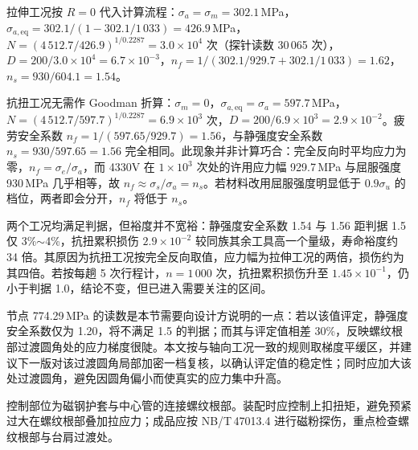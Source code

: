 拉伸工况按 $R=0$ 代入计算流程：$\sigma_a=\sigma_m=302.1$\,MPa，$\sigma_{a,\mathrm{eq}}=302.1/(1-302.1/1\,033)=426.9$\,MPa，$N=(4\,512.7/426.9)^{1/0.2287}=3.0\times10^{4}$ 次（探针读数 30\,065 次），$D=200/3.0\times10^{4}=6.7\times10^{-3}$，$n_f=1/(302.1/929.7+302.1/1\,033)=1.62$，$n_s=930/604.1=1.54$。

抗扭工况无需作 Goodman 折算：$\sigma_m=0$，$\sigma_{a,\mathrm{eq}}=\sigma_a=597.7$\,MPa，$N=(4\,512.7/597.7)^{1/0.2287}=6.9\times10^{3}$ 次，$D=200/6.9\times10^{3}=2.9\times10^{-2}$。疲劳安全系数 $n_f=1/(597.65/929.7)=1.56$，与静强度安全系数 $n_s=930/597.65=1.56$ 完全相同。此现象并非计算巧合：完全反向时平均应力为零，$n_f=\sigma_e/\sigma_a$，而 4330V 在 $1\times10^{3}$ 次处的许用应力幅 929.7\,MPa 与屈服强度 930\,MPa 几乎相等，故 $n_f\approx\sigma_s/\sigma_a=n_s$。若材料改用屈服强度明显低于 $0.9\sigma_u$ 的档位，两者即会分开，$n_f$ 将低于 $n_s$。

两个工况均满足判据，但裕度并不宽裕：静强度安全系数 1.54 与 1.56 距判据 1.5 仅 3\%$\sim$4\%，抗扭累积损伤 $2.9\times10^{-2}$ 较同族其余工具高一个量级，寿命裕度约 34 倍。其原因为抗扭工况按完全反向取值，应力幅为拉伸工况的两倍，损伤约为其四倍。若按每趟 5 次行程计，$n=1\,000$ 次，抗扭累积损伤升至 $1.45\times10^{-1}$，仍小于判据 1.0，结论不变，但已进入需要关注的区间。

节点 774.29\,MPa 的读数是本节需要向设计方说明的一点：若以该值评定，静强度安全系数仅为 1.20，将不满足 1.5 的判据；而其与评定值相差 30\%，反映螺纹根部过渡圆角处的应力梯度很陡。本文按与轴向工况一致的规则取梯度平缓区，并建议下一版对该过渡圆角局部加密一档复核，以确认评定值的稳定性；同时应加大该处过渡圆角，避免因圆角偏小而使真实的应力集中升高。

控制部位为磁钢护套与中心管的连接螺纹根部。装配时应控制上扣扭矩，避免预紧过大在螺纹根部叠加拉应力；成品应按 NB/T\,47013.4 进行磁粉探伤，重点检查螺纹根部与台肩过渡处。
